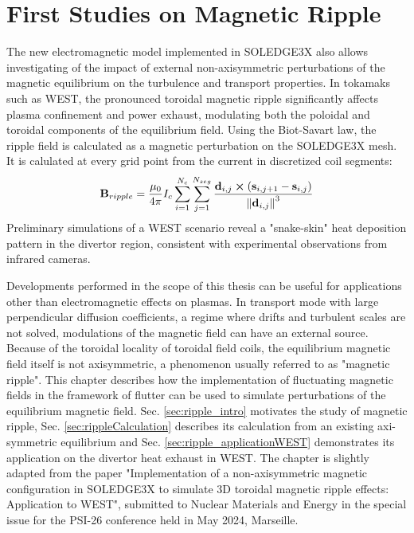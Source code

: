 \chapter{First Studies on Magnetic Ripple}
\label{chap:RippleMagnetic}


\begin{chaptersummarybox}
	The new electromagnetic model implemented in SOLEDGE3X also allows investigating of the impact of external non-axisymmetric perturbations of the magnetic equilibrium on the turbulence and transport properties. In tokamaks such as WEST, the pronounced toroidal magnetic ripple significantly affects plasma confinement and power exhaust, modulating both the poloidal and toroidal components of the equilibrium field. Using the Biot-Savart law, the ripple field is calculated as a magnetic perturbation on the SOLEDGE3X mesh. It is calulated at every grid point from the current in discretized coil segments:
	\begin{equation*}
		\textbf{B}_{ripple} = \frac{\mu_0}{4\pi}I_c\sum_{i=1}^{N_{c}}\sum_{j=1}^{N_{seg}}\frac{\textbf{d}_{i,j}\cross\left(\textbf{s}_{i,j+1} - \textbf{s}_{i,j}\right)}{\norm{\textbf{d}_{i,j}}^3}
	\end{equation*}	
	Preliminary simulations of a WEST scenario reveal a "snake-skin" heat deposition pattern in the divertor region, consistent with experimental observations from infrared cameras.
\end{chaptersummarybox}

\newpage


Developments performed in the scope of this thesis can be useful for applications other than electromagnetic effects on plasmas. In transport mode with large perpendicular diffusion coefficients, a regime where drifts and turbulent scales are not solved, modulations of the magnetic field can have an external source. Because of the toroidal locality of toroidal field coils, the equilibrium magnetic field itself is not axisymmetric, a phenomenon usually referred to as "magnetic ripple". This chapter describes how the implementation of fluctuating magnetic fields in the framework of flutter can be used to simulate perturbations of the equilibrium magnetic field. Sec. \ref{sec:ripple_intro} motivates the study of magnetic ripple, Sec. \ref{sec:rippleCalculation} describes its calculation from an existing axi-symmetric equilibrium and Sec. \ref{sec:ripple_applicationWEST} demonstrates its application on the divertor heat exhaust in WEST. The chapter is slightly adapted from the paper "Implementation of a non-axisymmetric magnetic configuration in SOLEDGE3X to simulate 3D toroidal magnetic ripple effects: Application to WEST", submitted to Nuclear Materials and Energy in the special issue for the PSI-26 conference held in May 2024, Marseille.


